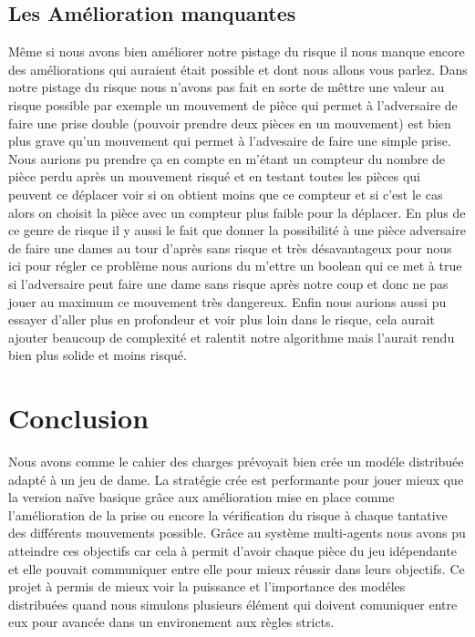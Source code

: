 \documentclass[11pt]{article} %
\begin{document}
\subsection{Les Amélioration manquantes}
Même si nous avons bien améliorer notre pistage du risque il nous manque encore des améliorations qui auraient était possible et dont nous allons vous parlez. Dans notre pistage du risque nous n'avons pas fait en sorte de mêttre une valeur au risque possible par exemple un mouvement de pièce qui permet à l'adversaire de faire une prise double (pouvoir prendre deux pièces en un mouvement) est bien plus grave qu'un mouvement qui permet à l'advesaire de faire une simple prise. Nous aurions pu prendre ça en compte en m'étant un compteur du nombre de pièce perdu après un mouvement risqué et en testant toutes les pièces qui peuvent ce déplacer voir si on obtient moins que ce compteur et si c'est le cas alors on choisit la pièce avec un compteur plus faible pour la déplacer. En plus de ce genre de risque il y aussi le fait que donner la possibilité à une pièce adversaire de faire une dames au tour d'après sans risque et très désavantageux pour nous ici pour régler ce problème nous aurions du m'ettre un boolean qui ce met à true si l'adversaire peut faire une dame sans risque après notre coup et donc ne pas jouer au maximum ce mouvement très dangereux. Enfin nous aurions aussi pu essayer d'aller plus en profondeur et voir plus loin dans le risque, cela aurait ajouter beaucoup de complexité et ralentit notre algorithme mais l'aurait rendu bien plus solide et moins risqué. 

\section{Conclusion}
Nous avons comme le cahier des charges prévoyait bien crée un modéle distribuée adapté à un jeu de dame. La stratégie crée est performante pour jouer mieux que la version naïve basique grâce aux amélioration mise en place comme l'amélioration de la prise ou encore la vérification du risque à chaque tantative des différents mouvements possible. Grâce au système multi-agents nous avons pu atteindre ces objectifs car cela à permit d'avoir chaque pièce du jeu idépendante et elle pouvait communiquer entre elle pour mieux réussir dans leurs objectifs. Ce projet à permis de mieux voir la puissance et l'importance des modéles distribuées quand nous simulons plusieurs élément qui doivent comuniquer entre eux pour avancée dans un environement aux règles stricts.
\end{document}
